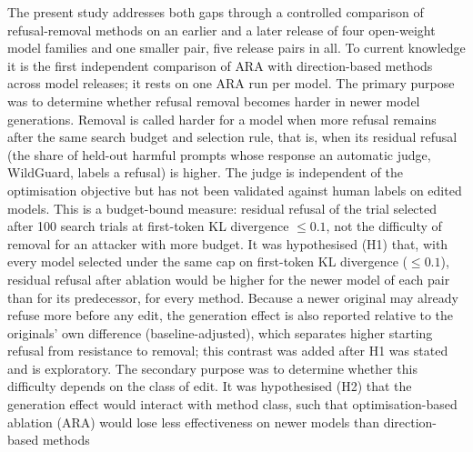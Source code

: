 The present study addresses both gaps through a controlled comparison of
refusal-removal methods on an earlier and a later release of four open-weight
model families and one smaller pair, five release pairs in all. To current
knowledge it is the first independent comparison of ARA with direction-based
methods across model releases; it rests on one ARA run per model. The primary purpose
was to determine whether refusal removal becomes harder in newer model
generations. Removal is called harder for a model when more refusal remains
after the same search budget and selection rule, that is, when its residual
refusal (the share of held-out harmful prompts whose response an automatic
judge, WildGuard, labels a refusal) is higher. The judge is independent of the
optimisation objective but has not been validated against human labels on
edited models. This is a budget-bound measure: residual refusal of the trial
selected after 100 search trials at first-token KL divergence $\le 0.1$, not
the difficulty of removal for an attacker with more budget.
It was hypothesised (H1) that,
with every model selected under the same cap on first-token KL divergence
($\le 0.1$), residual refusal after ablation would be higher for the newer
model of each pair than for its predecessor, for every method. Because a
newer original may already refuse more before any edit, the generation effect
is also reported relative to the originals' own difference (baseline-adjusted),
which separates higher starting refusal from resistance to removal; this
contrast was added after H1 was stated and is exploratory.
The secondary purpose was to determine whether this difficulty depends
on the class of edit. It was hypothesised (H2) that the generation effect would
interact with method class, such that optimisation-based ablation (ARA) would
lose less effectiveness on newer models than direction-based methods

